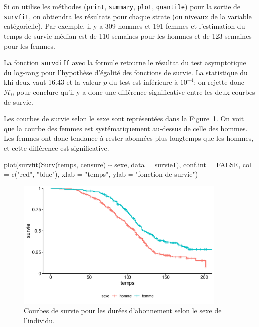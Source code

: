 \documentclass[
  11pt,
  letterpaper,
]{scrbook}
\newenvironment{Shaded}{\begin{snugshade}}{\end{snugshade}}
\newcommand{\AttributeTok}[1]{\textcolor[rgb]{0.40,0.45,0.13}{#1}}
\newcommand{\ConstantTok}[1]{\textcolor[rgb]{0.56,0.35,0.01}{#1}}
\newcommand{\FunctionTok}[1]{\textcolor[rgb]{0.28,0.35,0.67}{#1}}
\newcommand{\NormalTok}[1]{\textcolor[rgb]{0.00,0.23,0.31}{#1}}
\newcommand{\SpecialCharTok}[1]{\textcolor[rgb]{0.37,0.37,0.37}{#1}}
\newcommand{\StringTok}[1]{\textcolor[rgb]{0.13,0.47,0.30}{#1}}
\theoremstyle{definition}
\theoremstyle{remark}
\begin{document}
Si on utilise les méthodes (\texttt{print}, \texttt{summary},
\texttt{plot}, \texttt{quantile}) pour la sortie de \texttt{survfit}, on
obtiendra les résultats pour chaque strate (ou niveaux de la variable
catégorielle). Par exemple, il y a 309 hommes et 191 femmes et
l'estimation du temps de survie médian est de 110 semaines pour les
hommes et de 123 semaines pour les femmes.

La fonction \texttt{survdiff} avec la formule retourne le résultat du
test asymptotique du log-rang pour l'hypothèse d'égalité des fonctions
de survie. La statistique du khi-deux vaut 16.43 et la valeur-\(p\) du
test est inférieure à \(10^{-4}\): on rejette donc \(\mathscr{H}_0\)
pour conclure qu'il y a donc une différence significative entre les deux
courbes de survie.

Les courbes de survie selon le sexe sont représentées dans la
Figure~\ref{fig-survie-comparaison-courbes}. On voit que la courbe des
femmes est systématiquement au-dessus de celle des hommes. Les femmes
ont donc tendance à rester abonnées plus longtemps que les hommes, et
cette différence est significative.

\begin{Shaded}
\begin{Highlighting}[]
\FunctionTok{plot}\NormalTok{(}\FunctionTok{survfit}\NormalTok{(}\FunctionTok{Surv}\NormalTok{(temps, censure) }\SpecialCharTok{\textasciitilde{}}\NormalTok{ sexe, }
             \AttributeTok{data =}\NormalTok{ survie1), }
     \AttributeTok{conf.int =} \ConstantTok{FALSE}\NormalTok{,}
     \AttributeTok{col =} \FunctionTok{c}\NormalTok{(}\StringTok{"red"}\NormalTok{, }\StringTok{"blue"}\NormalTok{), }
     \AttributeTok{xlab =} \StringTok{"temps"}\NormalTok{, }
     \AttributeTok{ylab =} \StringTok{"fonction de survie"}\NormalTok{)}
\end{Highlighting}
\end{Shaded}

\begin{figure}[ht!]

{\centering \includegraphics[width=0.9\textwidth,height=\textheight]{survie_files/figure-pdf/fig-survie-comparaison-courbes-1.pdf}

}

\caption{\label{fig-survie-comparaison-courbes}Courbes de survie pour
les durées d'abonnement selon le sexe de l'individu.}

\end{figure}
\end{document}
